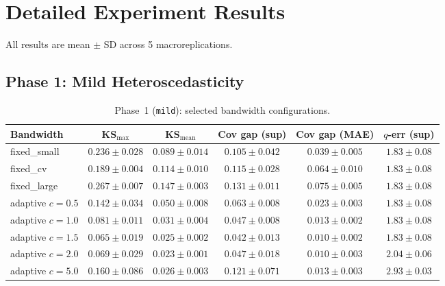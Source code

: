 \documentclass[11pt]{article}
\newif\ifpaper
\theoremstyle{remark}
\begin{document}
\ifpaper\else
\section{Detailed Experiment Results}
\label{sec:results}

All results are mean $\pm$ SD across 5 macroreplications.

\newcommand{\figdir}{../exp_score_homogeneity/output}

\subsection{Phase 1: Mild Heteroscedasticity}
\label{sec:results-mild}

\begin{table}[h]
\centering
\small
\caption{Phase~1 (\texttt{mild}): selected bandwidth configurations.}
\label{tab:mild}
\begin{tabular}{@{}lccccc@{}}
\toprule
\textbf{Bandwidth} & \textbf{KS$_{\max}$} & \textbf{KS$_{\mathrm{mean}}$}
  & \textbf{Cov gap (sup)} & \textbf{Cov gap (MAE)} & \textbf{$q$-err (sup)} \\
\midrule
fixed\_small & $0.236 \pm 0.028$ & $0.089 \pm 0.014$ & $0.105 \pm 0.042$
  & $0.039 \pm 0.005$ & $1.83 \pm 0.08$ \\
fixed\_cv    & $0.189 \pm 0.004$ & $0.114 \pm 0.010$ & $0.115 \pm 0.028$
  & $0.064 \pm 0.010$ & $1.83 \pm 0.08$ \\
fixed\_large & $0.267 \pm 0.007$ & $0.147 \pm 0.003$ & $0.131 \pm 0.011$
  & $0.075 \pm 0.005$ & $1.83 \pm 0.08$ \\
\midrule
adaptive $c\!=\!0.5$ & $0.142 \pm 0.034$ & $0.050 \pm 0.008$ & $0.063 \pm 0.008$
  & $0.023 \pm 0.003$ & $1.83 \pm 0.08$ \\
adaptive $c\!=\!1.0$ & $0.081 \pm 0.011$ & $0.031 \pm 0.004$ & $0.047 \pm 0.008$
  & $0.013 \pm 0.002$ & $1.83 \pm 0.08$ \\
adaptive $c\!=\!1.5$ & $\mathbf{0.065 \pm 0.019}$ & $\mathbf{0.025 \pm 0.002}$
  & $\mathbf{0.042 \pm 0.013}$ & $\mathbf{0.010 \pm 0.002}$
  & $1.83 \pm 0.08$ \\
adaptive $c\!=\!2.0$ & $0.069 \pm 0.029$ & $0.023 \pm 0.001$ & $0.047 \pm 0.018$
  & $0.010 \pm 0.003$ & $2.04 \pm 0.06$ \\
adaptive $c\!=\!5.0$ & $0.160 \pm 0.086$ & $0.026 \pm 0.003$ & $0.121 \pm 0.071$
  & $0.013 \pm 0.003$ & $2.93 \pm 0.03$ \\
\bottomrule
\end{tabular}
\end{table}
\end{document}
